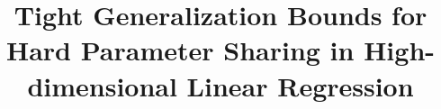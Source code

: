 \documentclass{article}
\begin{document}
\title{Tight Generalization Bounds for Hard Parameter Sharing in High-dimensional Linear Regression}
\maketitle



%


%
%





\appendix







\end{document}
